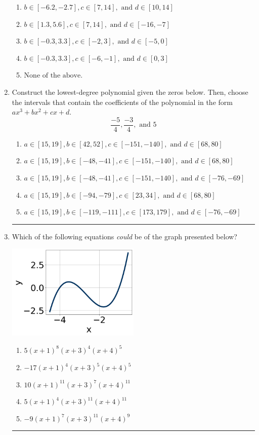 \documentclass[14pt]{extbook}
\newcommand{\litem}[1]{\item#1\hspace*{-1cm}\rule{\textwidth}{0.4pt}}
\begin{document}
\begin{enumerate}
{\begin{enumerate}[label=\Alph*.]
\item \( b \in [-6.2, -2.7], c \in [7, 14], \text{ and } d \in [10, 14] \)
\item \( b \in [1.3, 5.6], c \in [7, 14], \text{ and } d \in [-16, -7] \)
\item \( b \in [-0.3, 3.3], c \in [-2, 3], \text{ and } d \in [-5, 0] \)
\item \( b \in [-0.3, 3.3], c \in [-6, -1], \text{ and } d \in [0, 3] \)
\item \( \text{None of the above.} \)

\end{enumerate} }
\litem{
Construct the lowest-degree polynomial given the zeros below. Then, choose the intervals that contain the coefficients of the polynomial in the form $ax^3+bx^2+cx+d$.\[ \frac{-5}{4}, \frac{-3}{4}, \text{ and } 5 \]\begin{enumerate}[label=\Alph*.]
\item \( a \in [15, 19], b \in [42, 52], c \in [-151, -140], \text{ and } d \in [68, 80] \)
\item \( a \in [15, 19], b \in [-48, -41], c \in [-151, -140], \text{ and } d \in [68, 80] \)
\item \( a \in [15, 19], b \in [-48, -41], c \in [-151, -140], \text{ and } d \in [-76, -69] \)
\item \( a \in [15, 19], b \in [-94, -79], c \in [23, 34], \text{ and } d \in [68, 80] \)
\item \( a \in [15, 19], b \in [-119, -111], c \in [173, 179], \text{ and } d \in [-76, -69] \)

\end{enumerate} }
\litem{
Which of the following equations \textit{could} be of the graph presented below?
\begin{center}
    \includegraphics[width=0.5\textwidth]{../Figures/polyGraphToFunctionA.png}
\end{center}
\begin{enumerate}[label=\Alph*.]
\item \( 5(x + 1)^{8} (x + 3)^{4} (x + 4)^{5} \)
\item \( -17(x + 1)^{4} (x + 3)^{5} (x + 4)^{5} \)
\item \( 10(x + 1)^{11} (x + 3)^{7} (x + 4)^{11} \)
\item \( 5(x + 1)^{4} (x + 3)^{11} (x + 4)^{11} \)
\item \( -9(x + 1)^{7} (x + 3)^{11} (x + 4)^{9} \)


\end{enumerate}}
\end{enumerate}
\end{document}
